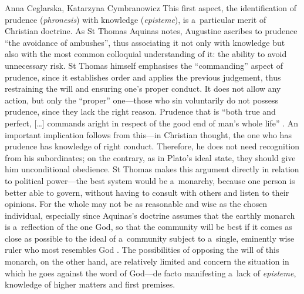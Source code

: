 \begin{artengenv2auth}{Anna Ceglarska, Katarzyna Cymbranowicz}
This first aspect, the identification of prudence (\textit{phronesis}) with knowledge (\textit{episteme}), is a~particular merit of Christian doctrine. As St Thomas Aquinas notes, Augustine ascribes to prudence ``the avoidance of ambushes'', thus associating it not only with knowledge but also with the most common colloquial understanding of it: the ability to avoid unnecessary risk. St Thomas himself emphasises the ``commanding'' aspect of prudence, since it establishes order and applies the previous judgement, thus restraining the will and ensuring one's proper conduct. It does not allow any action, but only the ``proper'' one---those who sin voluntarily do not possess prudence, since they lack the right reason. Prudence that is ``both true and perfect, […] commands aright in respect of the good end of man's whole life'' 
\parencite[][q.47 a.8,13]{thomas_aquinas_summa_1947}. %
 An important implication follows from this---in Christian thought, the one who has prudence has knowledge of right conduct. Therefore, he does not need recognition from his subordinates; on the contrary, as in Plato's ideal state, they should give him unconditional obedience. St Thomas makes this argument directly in relation to political power---the best system would be a~monarchy, because one person is better able to govern, without having to consult with others and listen to their opinions. For the whole may not be as reasonable and wise as the chosen individual, especially since Aquinas's doctrine assumes that the earthly monarch is a~reflection of the one God, so that the community will be best if it comes as close as possible to the ideal of a~community subject to a~single, eminently wise ruler who most resembles God 
\parencite[][]{thomas_aquinas_kingship_1949}. %
 The possibilities of opposing the will of this monarch, on the other hand, are relatively limited and concern the situation in which he goes against the word of God---de facto manifesting a~lack of \textit{episteme}, knowledge of higher matters and first premises.




\end{artengenv2auth}
